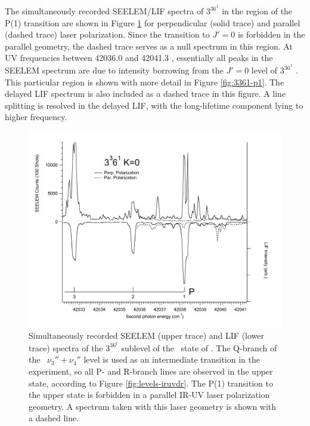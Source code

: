 \documentclass[12pt]{mitthesis}
\begin{document}


The simultaneously recorded SEELEM/LIF spectra of $3^36^1$  in
the region of the P(1) transition are shown in Figure
\ref{fig:3361-p1-polarization} for perpendicular (solid trace) and
parallel (dashed trace) laser polarization.  Since the transition to
$J'=0$ is forbidden in the parallel geometry, the dashed trace serves
as a null spectrum in this region.  At UV frequencies between 42036.0
and 42041.3 \rcm, essentially all peaks in the SEELEM spectrum are due
to intensity borrowing from the $J'=0$ level of $3^36^1$ .  This
particular region is shown with more detail in Figure
\ref{fig:3361-p1}.  The delayed LIF spectrum is also included as a
dashed trace in this figure.  A line splitting is resolved in the
delayed LIF, with the long-lifetime component lying to higher
frequency.


\begin{figure}
  \caption{Simultaneously recorded SEELEM (upper trace) and LIF (lower
    trace) spectra of the $3^36^1$  sublevel of the \astate\
    state of .  The Q-branch of the \xstate\ $\nu_3'' +
    \nu_4''$ level is used as an intermediate transition in the
    experiment, so all P- and R-branch lines are observed in the upper
    state, according to Figure \ref{fig:levels-iruvdr}.  The P(1)
    transition to the upper state is forbidden in a parallel IR-UV
    laser polarization geometry.  A spectrum taken with this laser
    geometry is shown with a dashed line.}
  \label{fig:3361-p1-polarization}
  \centering
  \includegraphics[width=7.3in,angle=90]{spectrum-3361-p1.pdf}
\end{figure}
\end{document}
